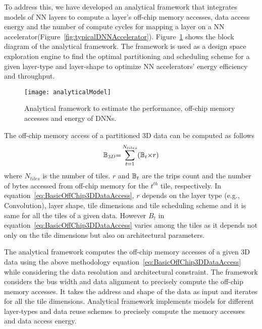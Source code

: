 To address this, we have developed an analytical framework that integrates models of NN layers to compute a layer's off-chip memory accesses, data access energy and the number of compute cycles for mapping a layer on a NN accelerator(Figure~\ref{fig:typicalDNNAccelerator}). Figure~\ref{fig:analyticalModel} shows the block diagram of the analytical framework. The framework is used as a design space exploration engine to find the optimal partitioning and scheduling scheme for a given layer-type and layer-shape to optimize NN accelerators' energy efficiency and throughput. 
\begin{figure}[!htb]
	\centering
    \captionsetup{font=sf}	
	\texttt{[image: analyticalModel]}
	\caption{Analytical framework to estimate the performance, off-chip memory accesses and energy of DNNs.}
	\label{fig:analyticalModel}
\end{figure}

The off-chip memory access of a partitioned 3D data can be computed as follows
\begin{align}\label{eq:BasicOffChip3DDataAccess}
	\mathbb{B}_{3D}{=}\sum_{t=1}^{N_{tiles}}(\mathbb{B}_{t}{\times}r)
\end{align}
where $N_{tiles}$ is the number of tiles. $r$ and $\mathbb{B}_{t}$ are the trips count and the number of bytes accessed from off-chip memory for the $t^{th}$ tile, respectively. In equation~\ref{eq:BasicOffChip3DDataAccess}, $r$ depends on the layer type (e.g., Convolution), layer shape, tile dimensions and tile scheduling scheme and it is same for all the tiles of a given data. However $B_t$ in equation~\ref{eq:BasicOffChip3DDataAccess} varies among the tiles as it  depends not only on the tile dimensions but also on architectural parameters.

The analytical framework computes the off-chip memory accesses of a given 3D data using the above methodology equation~\ref{eq:BasicOffChip3DDataAccess} while considering the data resolution and architectural constraint. The framework considers the bus width and data alignment to precisely compute the off-chip memory accesses. It takes the
address and shape of the data as input and iterates for all the tile dimensions. Analytical framework implements models for different layer-types and data reuse schemes to precisely compute the memory accesses and data access energy. 

